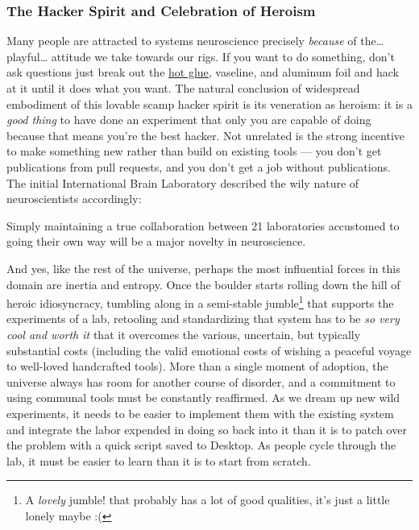 \documentclass[10pt]{article}
\begin{document}
\begin{multicols}{2}
{\subsubsection{The Hacker Spirit and Celebration of
Heroism}\label{the-hacker-spirit-and-celebration-of-heroism}}

Many people are attracted to systems neuroscience precisely
\emph{because} of the\ldots{} playful\ldots{} attitude we take towards
our rigs. If you want to do something, don't ask questions just break
out the \href{http://jvoigts.scripts.mit.edu/blog/review-hot-glue/}{hot
glue}, vaseline, and aluminum foil and hack at it until it does what you
want. The natural conclusion of widespread embodiment of this lovable
scamp hacker spirit is its veneration as heroism: it is a \emph{good
thing} to have done an experiment that only you are capable of doing
because that means you're the best hacker. Not unrelated is the strong
incentive to make something new rather than build on existing tools ---
you don't get publications from pull requests, and you don't get a job
without publications. The initial International Brain Laboratory
described the wily nature of neuroscientists accordingly:

\begin{leftbar}
Simply maintaining a true collaboration between 21 laboratories
accustomed to going their own way will be a major novelty in
neuroscience. \cite{abbottInternationalLaboratorySystems2017} 
\end{leftbar}

And yes, like the rest of the universe, perhaps the most influential
forces in this domain are inertia and entropy. Once the boulder starts
rolling down the hill of heroic idiosyncracy, tumbling along in a
semi-stable jumble\footnote{A \emph{lovely} jumble! that probably has a
  lot of good qualities, it's just a little lonely maybe :(} that
supports the experiments of a lab, retooling and standardizing that
system has to be \emph{so very cool and worth it} that it overcomes the
various, uncertain, but typically substantial costs (including the valid
emotional costs of wishing a peaceful voyage to well-loved handcrafted
tools). More than a single moment of adoption, the universe always has
room for another course of disorder, and a commitment to using communal
tools must be constantly reaffirmed. As we dream up new wild
experiments, it needs to be easier to implement them with the existing
system and integrate the labor expended in doing so back into it than it
is to patch over the problem with a quick script saved to Desktop. As
people cycle through the lab, it must be easier to learn than it is to
start from scratch.


\end{multicols}
\end{document}
